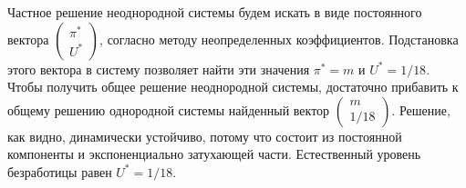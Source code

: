 \begin{problem}
\begin{sol}
Частное решение неоднородной системы будем искать в виде постоянного вектора
$
\begin{pmatrix}
\pi^* \\
U^*
\end{pmatrix}
$,
согласно методу неопределенных коэффициентов. Подстановка этого вектора в систему позволяет найти эти значения $\pi^*=m$ и  $U^*=1/18$.
Чтобы получить общее решение неоднородной системы, достаточно прибавить к общему решению однородной системы найденный вектор
$
\begin{pmatrix}
m \\
1/18
\end{pmatrix}
$. Решение, как видно, динамически устойчиво, потому что состоит из постоянной компоненты и экспоненциально затухающей части. Естественный уровень безработицы равен  $U^*=1/18$.
\end{sol}
\end{problem}

